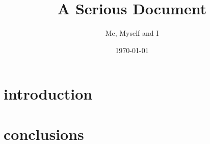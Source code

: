 \documentclass[a4paper, 10pt]{article}
\title{A Serious Document}
\author{Me, Myself and I}
\date{\today}
\begin{document}
\maketitle

\tableofcontents

\begin{abstract}

\end{abstract}


\section{introduction}


\section{conclusions}


\appendix
\end{document}
